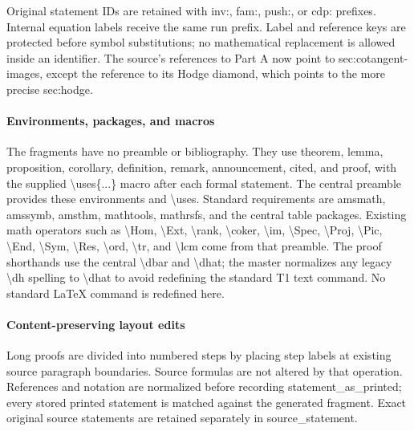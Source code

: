 \documentclass[11pt,a4paper]{article}
\theoremstyle{plain}
\theoremstyle{definition}
\begin{document}
Original statement IDs are retained with inv:\allowbreak{}, fam:\allowbreak{}, push:\allowbreak{}, or cdp:\allowbreak{} prefixes. Internal equation labels receive the same run prefix. Label and reference keys are protected before symbol substitutions; no mathematical replacement is allowed inside an identifier. The source's references to Part A now point to sec:\allowbreak{}cotangent-images, except the reference to its Hodge diamond, which points to the more precise sec:\allowbreak{}hodge.
\paragraph{Environments, packages, and macros}
The fragments have no preamble or bibliography. They use theorem, lemma, proposition, corollary, definition, remark, announcement, cited, and proof, with the supplied \textbackslash{}uses\{...\} macro after each formal statement. The central preamble provides these environments and \textbackslash{}uses. Standard requirements are amsmath, amssymb, amsthm, mathtools, mathrsfs, and the central table packages. Existing math operators such as \textbackslash{}Hom, \textbackslash{}Ext, \textbackslash{}rank, \textbackslash{}coker, \textbackslash{}im, \textbackslash{}Spec, \textbackslash{}Proj, \textbackslash{}Pic, \textbackslash{}End, \textbackslash{}Sym, \textbackslash{}Res, \textbackslash{}ord, \textbackslash{}tr, and \textbackslash{}lcm come from that preamble. The proof shorthands use the central \textbackslash{}dbar and \textbackslash{}dhat; the master normalizes any legacy \textbackslash{}dh spelling to \textbackslash{}dhat to avoid redefining the standard T1 text command. No standard LaTeX command is redefined here.
\paragraph{Content-preserving layout edits}
Long proofs are divided into numbered steps by placing step labels at existing source paragraph boundaries. Source formulas are not altered by that operation. References and notation are normalized before recording statement\_\allowbreak{}as\_\allowbreak{}printed; every stored printed statement is matched against the generated fragment. Exact original source statements are retained separately in source\_\allowbreak{}statement.
\end{document}
